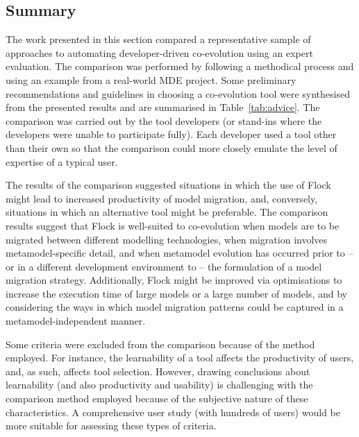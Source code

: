 \subsection{Summary}
The work presented in this section compared a representative sample of approaches to automating developer-driven co-evolution using an expert evaluation. The comparison was performed by following a methodical process and using an example from a real-world MDE project. Some preliminary recommendations and guidelines in choosing a co-evolution tool were synthesised from the presented results and are summarised in Table~\ref{tab:advice}. The comparison was carried out by the tool developers (or stand-ins where the developers were unable to participate fully). Each developer used a tool other than their own so that the comparison could more closely emulate the level of expertise of a typical user.

The results of the comparison suggested situations in which the use of Flock might lead to increased productivity of model migration, and, conversely, situations in which an alternative tool might be preferable. The comparison results suggest that Flock is well-suited to co-evolution when models are to be migrated between different modelling technologies, when migration involves metamodel-specific detail, and when metamodel evolution has occurred prior to -- or in a different development environment to -- the formulation of a model migration strategy. Additionally, Flock might be improved via optimisations to increase the execution time of large models or a large number of models, and by considering the ways in which model migration patterns could be captured in a metamodel-independent manner.

Some criteria were excluded from the comparison because of the method employed. For instance, the learnability of a tool affects the productivity of users, and, as such, affects tool selection. However, drawing conclusions about learnability (and also productivity and usability) is challenging with the comparison method employed because of the subjective nature of these characteristics. A comprehensive user study (with hundreds of users) would be more suitable for assessing these types of criteria.
